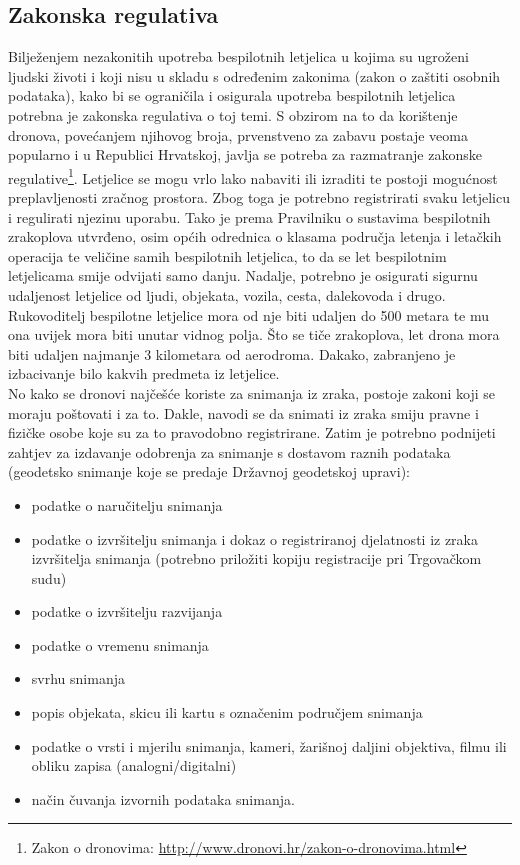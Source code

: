 \documentclass[times, utf8, diplomski]{fer}
\begin{document}
\subsection{Zakonska regulativa \citep{Ekscentar}} 
Bilježenjem nezakonitih upotreba bespilotnih letjelica u kojima su ugroženi ljudski životi i koji nisu u skladu s određenim zakonima (zakon o zaštiti osobnih podataka), kako bi se ograničila i osigurala upotreba bespilotnih letjelica potrebna je zakonska regulativa o toj temi. S obzirom na to da korištenje dronova, povećanjem njihovog broja, prvenstveno za zabavu postaje veoma popularno i u Republici Hrvatskoj, javlja se potreba za razmatranje zakonske regulative\footnote{Zakon o dronovima: \url{http://www.dronovi.hr/zakon-o-dronovima.html}}.  Letjelice  se  mogu  vrlo  lako  nabaviti  ili  izraditi  te  postoji mogućnost preplavljenosti zračnog prostora. Zbog toga je potrebno registrirati svaku letjelicu i regulirati njezinu uporabu. Tako je prema Pravilniku o sustavima bespilotnih zrakoplova utvrđeno, osim općih odrednica o klasama područja letenja i letačkih operacija te veličine samih bespilotnih letjelica, to da se let bespilotnim letjelicama smije odvijati samo danju. Nadalje, potrebno je osigurati sigurnu udaljenost letjelice od ljudi, objekata, vozila, cesta, dalekovoda i drugo. Rukovoditelj bespilotne letjelice mora od nje biti udaljen do 500 metara te mu ona uvijek mora biti unutar vidnog polja. Što se tiče zrakoplova, let  drona  mora  biti  udaljen  najmanje  3  kilometara  od  aerodroma.  Dakako,  zabranjeno  je izbacivanje bilo kakvih predmeta iz letjelice. \\
No kako se dronovi najčešće koriste za snimanja iz zraka, postoje zakoni koji se moraju poštovati i za to. Dakle, navodi se da snimati iz zraka smiju pravne i fizičke osobe koje su za to pravodobno registrirane. Zatim je potrebno podnijeti zahtjev za izdavanje odobrenja za snimanje s dostavom  raznih  podataka (geodetsko snimanje koje se predaje Državnoj geodetskoj upravi):
\begin{itemize}
\item podatke o naručitelju snimanja
\item podatke o izvršitelju snimanja i dokaz o registriranoj djelatnosti iz zraka izvršitelja snimanja (potrebno priložiti kopiju registracije pri Trgovačkom sudu)
\item podatke o izvršitelju razvijanja
\item podatke o vremenu snimanja
\item svrhu snimanja
\item popis objekata, skicu ili kartu s označenim područjem snimanja
\item podatke o vrsti i mjerilu snimanja, kameri, žarišnoj daljini objektiva, filmu ili obliku zapisa (analogni/digitalni)
\item način čuvanja izvornih podataka snimanja.
\end{itemize}
\end{document}
